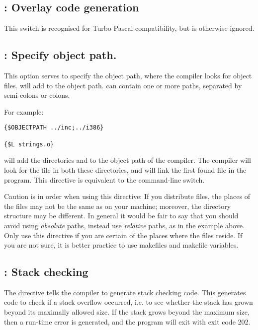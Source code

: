 \subsection{ : Overlay code generation }

This switch is recognised for Turbo Pascal compatibility, but is otherwise
ignored.

\subsection{ : Specify object path.}

This option serves to specify the object path, where the compiler looks for
object files.  will add  to the object
path.  can contain one or more paths, separated by semi-colons or
colons.

For example:
\begin{verbatim}
{$OBJECTPATH ../inc;../i386}

{$L strings.o}
\end{verbatim}

will add the directories  and  to the
object path of the compiler. The compiler will look for the file 
in both these directories, and will link the first found file in the
program. This directive is equivalent to the  command-line switch.

Caution is in order when using this directive: If you distribute files, the
places of the files may not be the same as on your machine; moreover, the
directory structure may be different. In general it would be fair to say
that you should avoid using {\em absolute} paths, instead use {\em relative}
paths, as in the example above. Only use this directive if you are certain
of the places where the files reside. If you are not sure, it is better
practice to use makefiles and makefile variables.

\subsection{ : Stack checking}

The  directive tells the compiler to generate stack checking
code. This generates code to check if a stack overflow occurred, i.e. to see
whether the stack has grown beyond its maximally allowed size. If the stack
grows beyond the maximum size, then a run-time error is generated, and the
program will exit with exit code 202.

